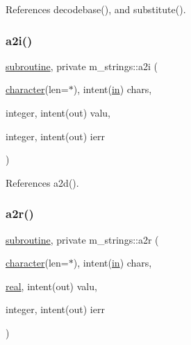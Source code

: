References decodebase(), and substitute().

\mbox{\label{namespacem__strings_aca902af295ede82fb0c45174bbfe6eef}} 
\subsubsection{\texorpdfstring{a2i()}{a2i()}}
{\footnotesize\ttfamily \hyperlink{M__stopwatch_83_8txt_acfbcff50169d691ff02d4a123ed70482}{subroutine}, private m\+\_\+strings\+::a2i (\begin{DoxyParamCaption}\item[{\hyperlink{option__stopwatch_83_8txt_abd4b21fbbd175834027b5224bfe97e66}{character}(len=$\ast$), intent(\hyperlink{M__journal_83_8txt_afce72651d1eed785a2132bee863b2f38}{in})}]{chars,  }\item[{integer, intent(out)}]{valu,  }\item[{integer, intent(out)}]{ierr }\end{DoxyParamCaption})\hspace{0.3cm}{\ttfamily [private]}}



References a2d().

\mbox{\label{namespacem__strings_a6b4babf586dc3586426b13e4bb0fb979}} 
\subsubsection{\texorpdfstring{a2r()}{a2r()}}
{\footnotesize\ttfamily \hyperlink{M__stopwatch_83_8txt_acfbcff50169d691ff02d4a123ed70482}{subroutine}, private m\+\_\+strings\+::a2r (\begin{DoxyParamCaption}\item[{\hyperlink{option__stopwatch_83_8txt_abd4b21fbbd175834027b5224bfe97e66}{character}(len=$\ast$), intent(\hyperlink{M__journal_83_8txt_afce72651d1eed785a2132bee863b2f38}{in})}]{chars,  }\item[{\hyperlink{read__watch_83_8txt_abdb62bde002f38ef75f810d3a905a823}{real}, intent(out)}]{valu,  }\item[{integer, intent(out)}]{ierr }\end{DoxyParamCaption})\hspace{0.3cm}{\ttfamily [private]}}



